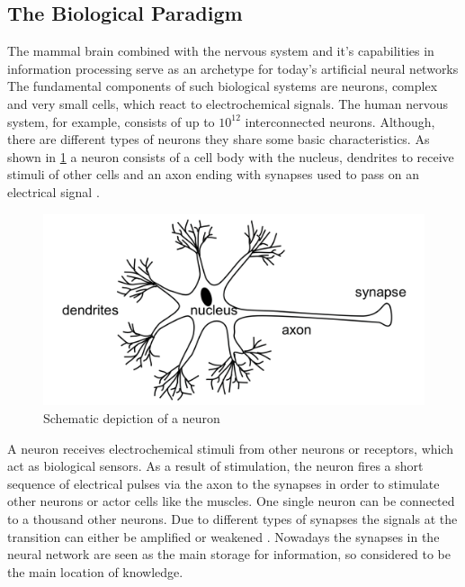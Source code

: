 \documentclass[12pt,a4paper]{article}
\begin{document}
\subsection{The Biological Paradigm}
The mammal brain combined with the nervous system and it's capabilities in information processing serve as an archetype for today's artificial neural networks\cite{Rojas1996}
The fundamental components of such biological systems are neurons, complex and very small cells, which react to electrochemical signals.
The human nervous system, for example, consists of up to $10^{12}$ interconnected neurons.
Although, there are different types of neurons they share some basic characteristics. As shown in \ref{fig:neuron_schemantic} a neuron consists of a cell body with the nucleus, dendrites to receive stimuli of other cells and an axon ending with synapses used to pass on an electrical signal \cite{Patterson1997}.
\begin{figure}
    \centering
    \includegraphics[width=0.5\linewidth]{Figures/Neuron_schemantic_depiction.png}
    \caption{Schematic depiction of a neuron}
    \label{fig:neuron_schemantic}
\end{figure}
A neuron receives electrochemical stimuli from other neurons or receptors, which act as biological sensors.
As a result of stimulation, the neuron fires a short sequence of electrical pulses via the axon to the synapses in order to stimulate other neurons or actor cells like the muscles. One single neuron can be connected to a thousand other neurons. Due to different types of synapses the signals at the transition can either be amplified or weakened \cite{Patterson1997}.
Nowadays the synapses in the neural network are seen as the main storage for information, so considered to be the main location of knowledge\cite{Rojas1996}.
\end{document}
